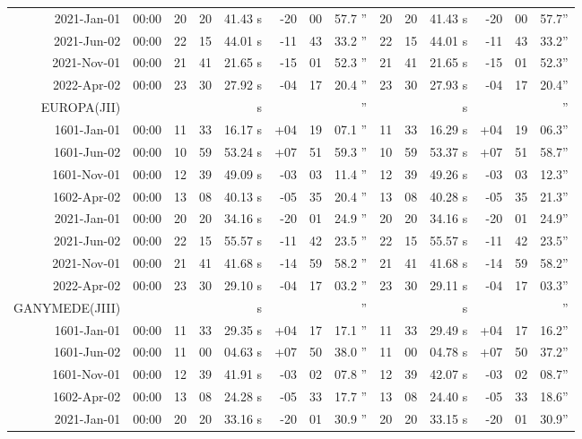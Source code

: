 \begin{longtable}{r@{\,}r|r@{h}r@{m}r<{s}|r@{°}r@{'}r<{''}||r@{h}r@{m}r<{s}|r@{°}r@{'}r<{''}}
 2021-Jan-01 & 00:00  &   20 & 20 & 41.43 & -20 & 00 & 57.7 & 20&20&41.43 & -20&00&57.7\\ %
 2021-Jun-02 & 00:00  &   22 & 15 & 44.01 & -11 & 43 & 33.2 & 22&15&44.01 & -11&43&33.2\\ %
 2021-Nov-01 & 00:00  &   21 & 41 & 21.65 & -15 & 01 & 52.3 & 21&41&21.65 & -15&01&52.3\\ %
 2022-Apr-02 & 00:00  &   23 & 30 & 27.92 & -04 & 17 & 20.4 & 23&30&27.93 & -04&17&20.4\\ %
EUROPA(JII)      \\
 1601-Jan-01 & 00:00  &   11 & 33 & 16.17 & +04 & 19 & 07.1 & 11&33&16.29 & +04&19&06.3\\ %
 1601-Jun-02 & 00:00  &   10 & 59 & 53.24 & +07 & 51 & 59.3 & 10&59&53.37 & +07&51&58.7\\ %
 1601-Nov-01 & 00:00  &   12 & 39 & 49.09 & -03 & 03 & 11.4 & 12&39&49.26 & -03&03&12.3\\ %
 1602-Apr-02 & 00:00  &   13 & 08 & 40.13 & -05 & 35 & 20.4 & 13&08&40.28 & -05&35&21.3\\ %
 2021-Jan-01 & 00:00  &   20 & 20 & 34.16 & -20 & 01 & 24.9 & 20&20&34.16 & -20&01&24.9\\ %
 2021-Jun-02 & 00:00  &   22 & 15 & 55.57 & -11 & 42 & 23.5 & 22&15&55.57 & -11&42&23.5\\ %
 2021-Nov-01 & 00:00  &   21 & 41 & 41.68 & -14 & 59 & 58.2 & 21&41&41.68 & -14&59&58.2\\ %
 2022-Apr-02 & 00:00  &   23 & 30 & 29.10 & -04 & 17 & 03.2 & 23&30&29.11 & -04&17&03.3\\ %
GANYMEDE(JIII)\\
 1601-Jan-01 & 00:00  &   11 & 33 & 29.35 & +04 & 17 & 17.1 & 11&33&29.49 & +04&17&16.2\\ %
 1601-Jun-02 & 00:00  &   11 & 00 & 04.63 & +07 & 50 & 38.0 & 11&00&04.78 & +07&50&37.2\\ %
 1601-Nov-01 & 00:00  &   12 & 39 & 41.91 & -03 & 02 & 07.8 & 12&39&42.07 & -03&02&08.7\\ %
 1602-Apr-02 & 00:00  &   13 & 08 & 24.28 & -05 & 33 & 17.7 & 13&08&24.40 & -05&33&18.6\\ %
 2021-Jan-01 & 00:00  &   20 & 20 & 33.16 & -20 & 01 & 30.9 & 20&20&33.15 & -20&01&30.9\\ %

\end{longtable}
